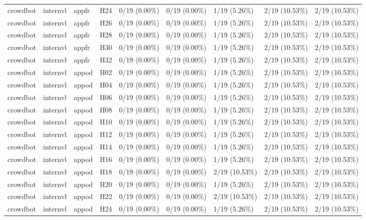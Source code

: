 \begin{longtable}{lllllllll}
crowdbot & internvl & appfr & H24 & 0/19 (0.00\%) & 0/19 (0.00\%) & 1/19 (5.26\%) & 2/19 (10.53\%) & 2/19 (10.53\%) \\
crowdbot & internvl & appfr & H26 & 0/19 (0.00\%) & 0/19 (0.00\%) & 1/19 (5.26\%) & 2/19 (10.53\%) & 2/19 (10.53\%) \\
crowdbot & internvl & appfr & H28 & 0/19 (0.00\%) & 0/19 (0.00\%) & 1/19 (5.26\%) & 2/19 (10.53\%) & 2/19 (10.53\%) \\
crowdbot & internvl & appfr & H30 & 0/19 (0.00\%) & 0/19 (0.00\%) & 1/19 (5.26\%) & 2/19 (10.53\%) & 2/19 (10.53\%) \\
crowdbot & internvl & appfr & H32 & 0/19 (0.00\%) & 0/19 (0.00\%) & 1/19 (5.26\%) & 2/19 (10.53\%) & 2/19 (10.53\%) \\
crowdbot & internvl & appod & H02 & 0/19 (0.00\%) & 0/19 (0.00\%) & 1/19 (5.26\%) & 2/19 (10.53\%) & 2/19 (10.53\%) \\
crowdbot & internvl & appod & H04 & 0/19 (0.00\%) & 0/19 (0.00\%) & 1/19 (5.26\%) & 2/19 (10.53\%) & 2/19 (10.53\%) \\
crowdbot & internvl & appod & H06 & 0/19 (0.00\%) & 0/19 (0.00\%) & 1/19 (5.26\%) & 2/19 (10.53\%) & 2/19 (10.53\%) \\
crowdbot & internvl & appod & H08 & 0/19 (0.00\%) & 0/19 (0.00\%) & 1/19 (5.26\%) & 2/19 (10.53\%) & 2/19 (10.53\%) \\
crowdbot & internvl & appod & H10 & 0/19 (0.00\%) & 0/19 (0.00\%) & 1/19 (5.26\%) & 2/19 (10.53\%) & 2/19 (10.53\%) \\
crowdbot & internvl & appod & H12 & 0/19 (0.00\%) & 0/19 (0.00\%) & 1/19 (5.26\%) & 2/19 (10.53\%) & 2/19 (10.53\%) \\
crowdbot & internvl & appod & H14 & 0/19 (0.00\%) & 0/19 (0.00\%) & 1/19 (5.26\%) & 2/19 (10.53\%) & 2/19 (10.53\%) \\
crowdbot & internvl & appod & H16 & 0/19 (0.00\%) & 0/19 (0.00\%) & 1/19 (5.26\%) & 2/19 (10.53\%) & 2/19 (10.53\%) \\
crowdbot & internvl & appod & H18 & 0/19 (0.00\%) & 0/19 (0.00\%) & 2/19 (10.53\%) & 2/19 (10.53\%) & 2/19 (10.53\%) \\
crowdbot & internvl & appod & H20 & 0/19 (0.00\%) & 0/19 (0.00\%) & 1/19 (5.26\%) & 2/19 (10.53\%) & 2/19 (10.53\%) \\
crowdbot & internvl & appod & H22 & 0/19 (0.00\%) & 0/19 (0.00\%) & 2/19 (10.53\%) & 2/19 (10.53\%) & 2/19 (10.53\%) \\
crowdbot & internvl & appod & H24 & 0/19 (0.00\%) & 0/19 (0.00\%) & 1/19 (5.26\%) & 2/19 (10.53\%) & 2/19 (10.53\%) \\

\end{longtable}
